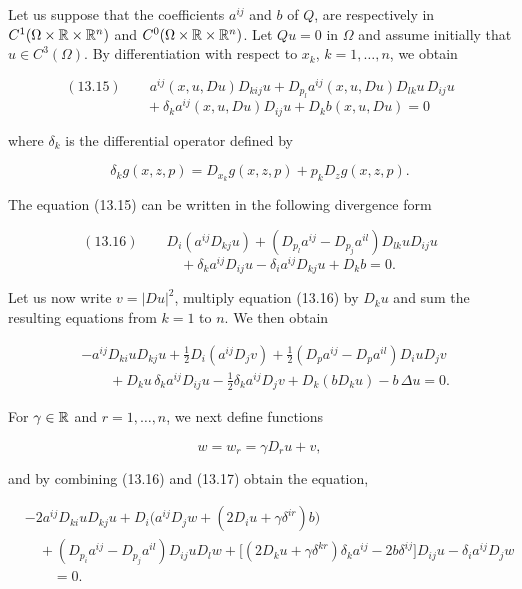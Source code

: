 Let us suppose that the coefficients $a^{ij}$ and $b$ of $Q$, are respectively in
$C^1(\Omega \times \mathbb{R} \times \mathbb{R}^n)$ and $C^0(\Omega \times \mathbb{R} \times \mathbb{R}^n)$. Let $Qu = 0$ in
$\Omega$ and assume initially that $u \in C^3(\Omega)$. By differentiation with respect to
$x_k$, $k = 1,\dots,n$, we obtain

\[
(13.15)\qquad a^{ij}(x,u,Du)D_{kij}u + D_{p_l}a^{ij}(x,u,Du)D_{lk}u\,D_{ij}u
\]
\[
\qquad\qquad + \delta_k a^{ij}(x,u,Du)D_{ij}u + D_k b(x,u,Du) = 0
\]

where $\delta_k$ is the differential operator defined by

\[
\delta_k g(x,z,p) = D_{x_k}g(x,z,p) + p_k D_z g(x,z,p).
\]

The equation (13.15) can be written in the following divergence form

\[
(13.16)\qquad D_i(a^{ij}D_{kj}u) + (D_{p_l}a^{ij} - D_{p_j}a^{il})D_{lk}uD_{ij}u
\]
\[
\qquad\qquad + \delta_k a^{ij}D_{ij}u - \delta_i a^{ij}D_{kj}u + D_k b = 0.
\]




Let us now write $v=|Du|^2$, multiply equation (13.16) by $D_ku$ and sum the resulting equations from $k=1$ to $n$. We then obtain

\begin{equation}
\begin{aligned}
&-a^{ij}D_{ki}uD_{kj}u+\frac{1}{2}D_i(a^{ij}D_jv)+\frac{1}{2}(D_p a^{ij}-D_p a^{il})D_i uD_jv \\
&\qquad +D_ku\,\delta_k a^{ij}D_{ij}u-\frac{1}{2}\delta_k a^{ij}D_jv+D_k(bD_ku)-b\,\Delta u=0.
\end{aligned}
\tag{13.17}
\end{equation}

For $\gamma\in\mathbb{R}$ and $r=1,\dots,n$, we next define functions

\begin{equation}
w=w_r=\gamma D_ru+v,
\tag{13.18}
\end{equation}

and by combining (13.16) and (13.17) obtain the equation,

\begin{equation}
\begin{aligned}
&-2a^{ij}D_{ki}uD_{kj}u+D_i\!\bigl(a^{ij}D_jw+(2D_iu+\gamma\delta^{ir})b\bigr) \\
&\quad +(D_{p_i}a^{ij}-D_{p_j}a^{il})D_{ij}uD_lw+\bigl[(2D_ku+\gamma\delta^{kr})\delta_k a^{ij}-2b\delta^{ij}\bigr]D_{ij}u-\delta_i a^{ij}D_jw \\
&\qquad =0.
\end{aligned}
\tag{13.19}
\end{equation}

